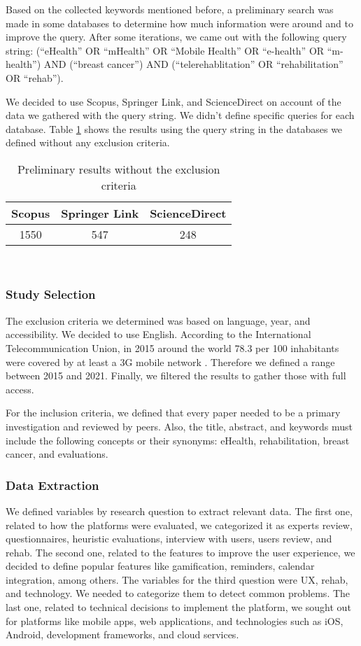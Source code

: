\documentclass[conference]{IEEEtran}
\begin{document}
Based on the collected keywords mentioned before, a preliminary search was made in some databases to determine how much information were around and to improve the query. After some iterations, we came out with the following query string: (``eHealth'' OR ``mHealth'' OR ``Mobile Health'' OR ``e-health'' OR ``m-health'') AND (``breast cancer'') AND (``telerehablitation'' OR ``rehabilitation'' OR ``rehab'').

We decided to use Scopus, Springer Link, and ScienceDirect on account of the data we gathered with the query string. We didn't define specific queries for each database. Table \ref{table:preliminary_results} shows the results using the query string in the databases we defined without any exclusion criteria.

\begin{table}[h!]
\centering
\begin{tabular}{||c c c||} 
 \hline
 Scopus & Springer Link & ScienceDirect \\
 \hline\hline
 1550 & 547 & 248 \\ 
 \hline
\end{tabular} \\ [1ex] 
\caption{Preliminary results without the exclusion criteria}
\label{table:preliminary_results}
\end{table}

\subsubsection{Study Selection}
The exclusion criteria we determined was based on language, year, and accessibility.  We decided to use English. According to the International Telecommunication Union, in 2015 around the world 78.3 per 100 inhabitants were covered by at least a 3G mobile network \cite{ITU}. Therefore we defined a range between 2015 and 2021. Finally, we filtered the results to gather those with full access.

For the inclusion criteria, we defined that every paper needed to be a primary investigation and reviewed by peers. Also, the title, abstract, and keywords must include the following concepts or their synonyms: eHealth, rehabilitation, breast cancer, and evaluations.

\subsubsection{Data Extraction}
We defined variables by research question to extract relevant data. The first one, related to how the platforms were evaluated, we categorized it as experts review, questionnaires, heuristic evaluations, interview with users, users review, and rehab. The second one, related to the features to improve the user experience, we decided to define popular features like gamification, reminders, calendar integration, among others. The variables for the third question were UX, rehab, and technology. We needed to categorize them to detect common problems. The last one, related to technical decisions to implement the platform, we sought out for platforms like mobile apps, web applications, and technologies such as iOS, Android, development frameworks, and cloud services. 
\end{document}
